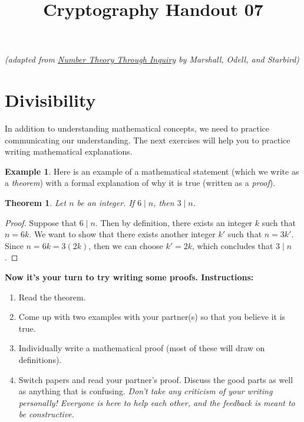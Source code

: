 \documentclass[12pt]{amsart}
\makeatletter
\def\subtitle#1{\gdef\@subtitle{#1}}
\def\@subtitle{}
\theoremstyle{plain}
\newtheorem{thm}{Theorem}[section]
\theoremstyle{definition}
\newtheorem*{ex}{Example}
\makeatother
\begin{document}
\onehalfspacing

\title[]{Cryptography Handout 07}
\subtitle{``Divide and Conquer"}

\maketitle

\begin{center}
\emph{(adapted from \underline{Number Theory Through Inquiry} by Marshall, Odell, and Starbird)}
\end{center}

\section{Divisibility}
In addition to understanding mathematical concepts, we need to practice communicating our understanding.  The next exercises will help you to practice writing mathematical explanations.\\

\begin{ex}
Here is an example of a mathematical statement (which we write as a \emph{theorem}) with a formal explanation of why it is true (written as a \emph{proof}).
\begin{thm}
Let $n$ be an integer.  If $6 \mid n$, then $3 \mid n$.
\end{thm}
\begin{proof}
Suppose that $6 \mid n$.  Then by definition, there exists an integer $k$ such that $n = 6k$.  We want to show that there exists another integer $k'$ such that $n = 3k'$.  Since $n = 6k = 3(2k)$, then we can choose $k' = 2k$, which concludes that $3 \mid n$.
\end{proof}
\end{ex}

\begin{center}\textbf{Now it's your turn to try writing some proofs.  Instructions:}\end{center}
\begin{enumerate}[1.]
	\item Read the theorem.
	\item Come up with two examples with your partner(s) so that you believe it is true.
	\item Individually write a mathematical proof (most of these will draw on definitions).
	\item Switch papers and read your partner's proof.  Discuss the good parts as well as anything that is confusing.  \emph{Don't take any criticism of your writing personally!  Everyone is here to help each other, and the feedback is meant to be constructive.}
\end{enumerate}
\end{document}
